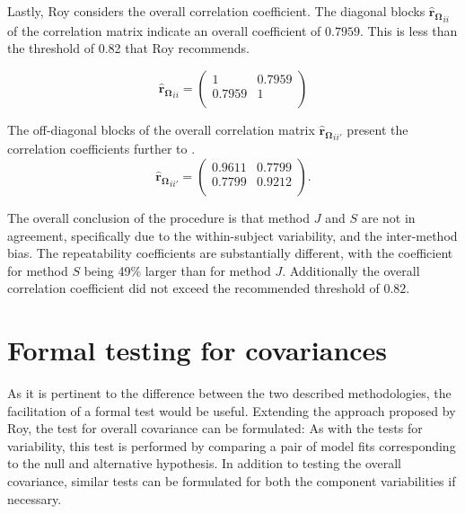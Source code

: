 \documentclass[12pt, a4paper]{report}
\theoremstyle{plain}
\theoremstyle{definition}
\theoremstyle{remark}
\begin{document}
Lastly, Roy considers the overall correlation coefficient. The diagonal blocks $\boldsymbol{\hat{r}_{\Omega}}_{ii}$ of the correlation matrix indicate an overall coefficient of $0.7959$. This is less than the threshold of 0.82 that Roy recommends.

\[
\boldsymbol{\hat{r}_{\Omega}}_{ii} = \left( \begin{array}{cc}
1  & 0.7959  \\
0.7959  & 1  \\
\end{array}\right)
\]

The off-diagonal blocks of the overall correlation matrix $\boldsymbol{\hat{r}_{\Omega}}_{ii'}$ present the correlation coefficients further to \citet{hamlett}.
\[
\boldsymbol{\hat{r}_{\Omega}}_{ii'} = \left( \begin{array}{cc}
0.9611  & 0.7799  \\
0.7799  & 0.9212  \\
\end{array}\right).
\]

The overall conclusion of the procedure is that method $J$ and $S$ are not in agreement, specifically due to the within-subject variability, and the inter-method bias. The repeatability coefficients are substantially different, with the coefficient for method $S$ being 49\% larger than for method $J$. Additionally the overall correlation coefficient did not exceed the recommended threshold of $0.82$.
\section{Formal testing for covariances }
As it is pertinent to the difference between the two described methodologies, the facilitation of a formal test would be useful. Extending the approach proposed by Roy, the test for overall covariance can be formulated:
As with the tests for variability, this test is performed by comparing a pair of model fits corresponding to the null and alternative hypothesis. In addition to testing the overall covariance, similar tests can be formulated for both the component variabilities if necessary.

\end{document}
